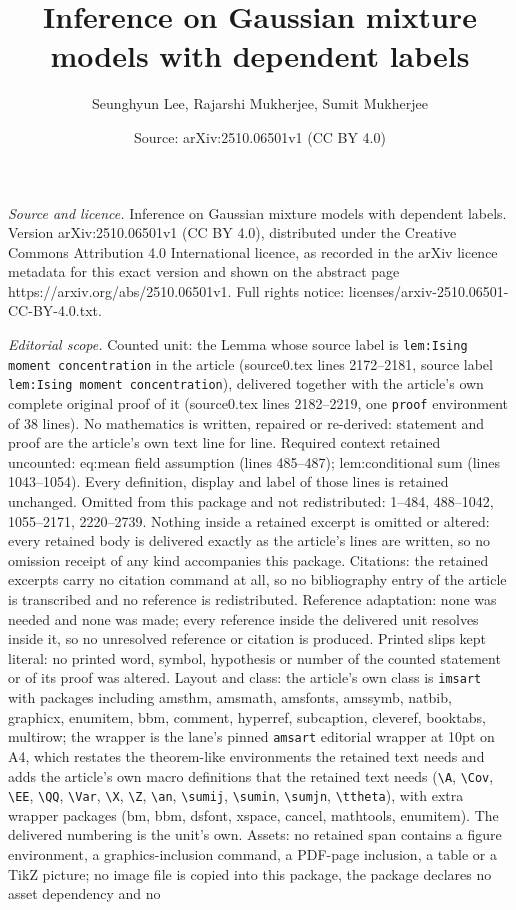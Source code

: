 \documentclass[10pt,a4paper]{amsart}
\title[Inference on Gaussian mixture models with dependent labels]{Inference on Gaussian mixture models with dependent labels}
\author{Seunghyun Lee, Rajarshi Mukherjee, Sumit Mukherjee}
\date{Source: arXiv:2510.06501v1 (CC BY 4.0)}
\begin{document}
\maketitle

\noindent\emph{Source and licence.} Inference on Gaussian mixture models with dependent labels. Version arXiv:2510.06501v1 (CC BY 4.0), distributed under the Creative Commons Attribution 4.0 International licence, as recorded in the arXiv licence metadata for this exact version and shown on the abstract page https://arxiv.org/abs/2510.06501v1. Full rights notice: licenses/arxiv-2510.06501-CC-BY-4.0.txt.\par\smallskip

\noindent\textit{Editorial scope.} Counted unit: the Lemma whose source label is \texttt{lem:Ising moment concentration} in the article (source0.tex lines 2172--2181, source label \texttt{lem:Ising moment concentration}), delivered together with the article's own complete original proof of it (source0.tex lines 2182--2219, one \texttt{proof} environment of 38 lines). No mathematics is written, repaired or re-derived: statement and proof are the article's own text line for line. Required context retained uncounted: eq:mean field assumption (lines 485--487); lem:conditional sum (lines 1043--1054). Every definition, display and label of those lines is retained unchanged. Omitted from this package and not redistributed: 1--484, 488--1042, 1055--2171, 2220--2739. Nothing inside a retained excerpt is omitted or altered: every retained body is delivered exactly as the article's lines are written, so no omission receipt of any kind accompanies this package. Citations: the retained excerpts carry no citation command at all, so no bibliography entry of the article is transcribed and no reference is redistributed. Reference adaptation: none was needed and none was made; every reference inside the delivered unit resolves inside it, so no unresolved reference or citation is produced. Printed slips kept literal: no printed word, symbol, hypothesis or number of the counted statement or of its proof was altered. Layout and class: the article's own class is \texttt{imsart} with packages including amsthm, amsmath, amsfonts, amssymb, natbib, graphicx, enumitem, bbm, comment, hyperref, subcaption, cleveref, booktabs, multirow; the wrapper is the lane's pinned \texttt{amsart} editorial wrapper at 10pt on A4, which restates the theorem-like environments the retained text needs and adds the article's own macro definitions that the retained text needs (\texttt{\textbackslash A}, \texttt{\textbackslash Cov}, \texttt{\textbackslash EE}, \texttt{\textbackslash QQ}, \texttt{\textbackslash Var}, \texttt{\textbackslash X}, \texttt{\textbackslash Z}, \texttt{\textbackslash an}, \texttt{\textbackslash sumij}, \texttt{\textbackslash sumin}, \texttt{\textbackslash sumjn}, \texttt{\textbackslash ttheta}), with extra wrapper packages (bm, bbm, dsfont, xspace, cancel, mathtools, enumitem). The delivered numbering is the unit's own. Assets: no retained span contains a figure environment, a graphics-inclusion command, a PDF-page inclusion, a table or a TikZ picture; no image file is copied into this package, the package declares no asset dependency and no 
\end{document}
